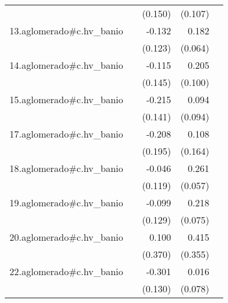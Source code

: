 {\begin{longtable}{l*{4}{D{.}{.}{-1}}}
            &                     &     (0.150)         &     (0.107)         &                     \\
\addlinespace
13.aglomerado#c.hv\_banio&                     &      -0.132         &       0.182\sym{**} &                     \\
            &                     &     (0.123)         &     (0.064)         &                     \\
\addlinespace
14.aglomerado#c.hv\_banio&                     &      -0.115         &       0.205\sym{*}  &                     \\
            &                     &     (0.145)         &     (0.100)         &                     \\
\addlinespace
15.aglomerado#c.hv\_banio&                     &      -0.215         &       0.094         &                     \\
            &                     &     (0.141)         &     (0.094)         &                     \\
\addlinespace
17.aglomerado#c.hv\_banio&                     &      -0.208         &       0.108         &                     \\
            &                     &     (0.195)         &     (0.164)         &                     \\
\addlinespace
18.aglomerado#c.hv\_banio&                     &      -0.046         &       0.261\sym{***}&                     \\
            &                     &     (0.119)         &     (0.057)         &                     \\
\addlinespace
19.aglomerado#c.hv\_banio&                     &      -0.099         &       0.218\sym{**} &                     \\
            &                     &     (0.129)         &     (0.075)         &                     \\
\addlinespace
20.aglomerado#c.hv\_banio&                     &       0.100         &       0.415         &                     \\
            &                     &     (0.370)         &     (0.355)         &                     \\
\addlinespace
22.aglomerado#c.hv\_banio&                     &      -0.301\sym{*}  &       0.016         &                     \\
            &                     &     (0.130)         &     (0.078)         &                     \\

\end{longtable}}

